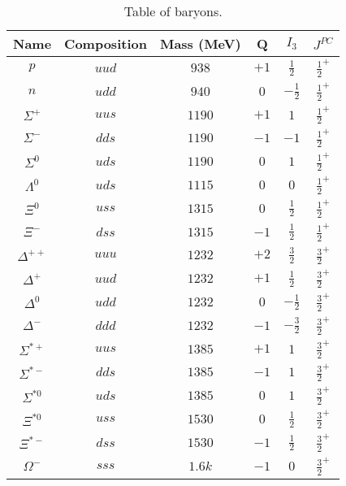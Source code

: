 \documentclass{article}
\begin{document}
\begin{table}[h!]
    \centering
    \begin{tabular}{||c c c c c c||} 
    \hline
    Name & Composition & Mass (MeV) & Q & $I_3$ & $J^{PC}$ \\ [0.5ex] 
    \hline\hline
    $p$ & $uud$ & $938$ & $+1$ & $\frac{1}{2}$ & $\frac{1}{2}^{+}$ \\[1ex]
    $n$ & $udd$ & $940$ & $0$ & $-\frac{1}{2}$ & $\frac{1}{2}^{+}$ \\[1ex]
    $\Sigma^+$ & $uus$ & $1190$ & $+1$ & $1$ & $\frac{1}{2}^{+}$ \\[1ex]
    $\Sigma^-$ & $dds$ & $1190$ & $-1$ & $-1$ & $\frac{1}{2}^{+}$ \\[1ex]
    $\Sigma^0$ & $uds$ & $1190$ & $0$ & $1$ & $\frac{1}{2}^{+}$ \\[1ex]
    $\Lambda^0$ & $uds$ & $1115$ & $0$ & $0$ & $\frac{1}{2}^{+}$ \\[1ex]
    $\Xi^0$ & $uss$ & $1315$ & $0$ & $\frac{1}{2}$ & $\frac{1}{2}^{+}$ \\[1ex]
    $\Xi^-$ & $dss$ & $1315$ & $-1$ & $\frac{1}{2}$ & $\frac{1}{2}^{+}$ \\[1ex]
    $\Delta^{++}$ & $uuu$ & $1232$ & $+2$ & $\frac{3}{2}$ & $\frac{3}{2}^{+}$ \\[1ex]
    $\Delta^+$ & $uud$ & $1232$ & $+1$ & $\frac{1}{2}$ & $\frac{3}{2}^{+}$ \\[1ex]
    $\Delta^0$ & $udd$ & $1232$ & $0$ & $-\frac{1}{2}$ & $\frac{3}{2}^{+}$ \\[1ex]
    $\Delta^-$ & $ddd$ & $1232$ & $-1$ & $-\frac{3}{2}$ & $\frac{3}{2}^{+}$ \\[1ex]
    $\Sigma^{*+}$ & $uus$ & $1385$ & $+1$ & $1$ & $\frac{3}{2}^{+}$ \\[1ex]
    $\Sigma^{*-}$ & $dds$ & $1385$ & $-1$ & $1$ & $\frac{3}{2}^{+}$ \\[1ex]
    $\Sigma^{*0}$ & $uds$ & $1385$ & $0$ & $1$ & $\frac{3}{2}^{+}$ \\[1ex]
    $\Xi^{*0}$ & $uss$ & $1530$ & $0$ & $\frac{1}{2}$ & $\frac{3}{2}^{+}$ \\[1ex]
    $\Xi^{*-}$ & $dss$ & $1530$ & $-1$ & $\frac{1}{2}$ & $\frac{3}{2}^{+}$ \\[1ex]
    $\Omega^-$ & $sss$ & $1.6k$ & $-1$ & $0$ & $\frac{3}{2}^{+}$ \\[1ex]
    \hline
    \end{tabular}
    \caption{Table of baryons.}
    \label{table:baryons}
\end{table}
\end{document}
